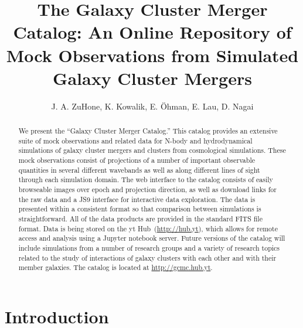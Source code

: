 \documentclass{emulateapj}
\begin{document}
\title{The Galaxy Cluster Merger Catalog: An Online Repository of Mock Observations from Simulated Galaxy Cluster Mergers}

\author{J. A. ZuHone, K. Kowalik, E. \"{O}hman, E. Lau, D. Nagai}


\begin{abstract}
We present the ``Galaxy Cluster Merger Catalog.'' This catalog provides an extensive suite of mock observations and related data for N-body and hydrodynamical simulations of galaxy cluster mergers and clusters from cosmological simulations. These mock observations consist of projections of a number of important observable quantities in several different wavebands as well as along different lines of sight through each simulation domain. The web interface to the catalog consists of easily browseable images over epoch and projection direction, as well as download links for the raw data and a JS9 interface for interactive data exploration. The data is presented within a consistent format so that comparison between simulations is straightforward. All of the data products are provided in the standard FITS file format. Data is being stored on the yt Hub~(\url{http://hub.yt}), which allows for remote access and analysis using a Jupyter notebook server. Future versions of the catalog will include simulations from a number of research groups and a variety of research topics related to the study of interactions of galaxy clusters with each other and with their member galaxies. The catalog is located at \url{http://gcmc.hub.yt}.
\end{abstract}


\section{Introduction}\label{sec:intro}
\end{document}
